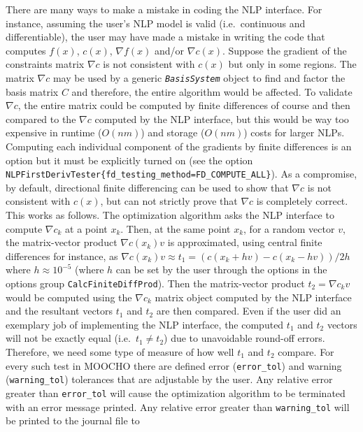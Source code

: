 \documentclass[pdf,ps2pdf,11pt]{SANDreport}
\begin{document}
There are many ways to make a mistake in coding the NLP interface.  For
instance, assuming the user's NLP model is valid (i.e.~continuous and
differentiable), the user may have made a mistake in writing the code that
computes $f(x)$, $c(x)$, $\nabla f(x)$ and/or $\nabla c(x)$.  Suppose the
gradient of the constraints matrix $\nabla c$ is not consistent with $c(x)$
but only in some regions.  The matrix $\nabla c$ may be used by a generic
{}\texttt{\textit{Basis\-System}} object to find and factor the basis matrix
$C$ and therefore, the entire algorithm would be affected.  To validate
$\nabla c$, the entire matrix could be computed by finite differences of
course and then compared to the $\nabla c$ computed by the NLP interface, but
this would be way too expensive in runtime ($O(n m)$) and storage ($O(n m)$)
costs for larger NLPs.  Computing each individual component of the gradients
by finite differences is an option but it must be explicitly turned on (see
the option
{}\texttt{NLP\-First\-Deriv\-Tester\{\-fd\-\_testing\-\_method\-=FD\-\_COMPUTE\-\_ALL\-\}}).
As a compromise, by default, directional finite differencing can be used to
show that $\nabla c$ is not consistent with $c(x)$, but can not strictly prove
that $\nabla c$ is completely correct.  This works as follows.  The
optimization algorithm asks the NLP interface to compute $\nabla c_k$ at a
point $x_k$.  Then, at the same point $x_k$, for a random vector $v$, the
matrix-vector product $\nabla c(x_k) v$ is approximated, using central finite
differences for instance, as $\nabla c(x_k) v \approx t_1 = ( c(x_k + h v) -
c(x_k - h v) ) / 2 h$ where $h \approx 10^{-5}$ (where $h$ can be set by the
user through the options in the options group
{}\texttt{Calc\-Finite\-Diff\-Prod}).  Then the matrix-vector product $t_2 =
\nabla c_k v$ would be computed using the $\nabla c_k$ matrix object computed
by the NLP interface and the resultant vectors $t_1$ and $t_2$ are then
compared.  Even if the user did an exemplary job of implementing the NLP
interface, the computed $t_1$ and $t_2$ vectors will not be exactly equal
(i.e.~$t_1
\neq t_2$) due to unavoidable round-off errors.  Therefore, we need
some type of measure of how well $t_1$ and $t_2$ compare.  For every such test
in MOOCHO there are defined error (\texttt{error\_tol}) and warning
(\texttt{warning\_tol}) tolerances that are adjustable by the user.  Any
relative error greater than {}\texttt{error\_tol} will cause the optimization
algorithm to be terminated with an error message printed.  Any relative error
greater than {}\texttt{warning\_tol} will be printed to the journal file to
\end{document}
